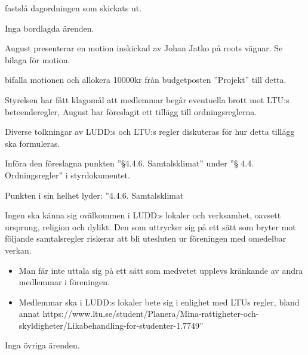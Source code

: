 \documentclass{protokoll}
\begin{document}
\newpage  


\begin{beslut}
     \att fastslå dagordningen som skickats ut.
\end{beslut}

Inga bordlagda ärenden.

August presenterar en motion inskickad av Johan Jatko på roots vägnar. Se
bilaga för motion. 
\begin{beslut}
    \att bifalla motionen och allokera 10000kr från budgetposten ''Projekt'' till detta.
\end{beslut}

Styrelsen har fått klagomål att medlemmar begår eventuella brott mot LTU:s 
beteenderegler, August har föreslagit ett tillägg till ordningsreglerna.  

Diverse tolkningar av LUDD:s och LTU:s regler diskuteras för hur detta tillägg
ska formuleras. 

\begin{beslut}
  \att Införa den föreslagna punkten ''\S 4.4.6. Samtalsklimat'' under ''\S
  4.4. Ordningsregler'' i styrdokumentet. 
\end{beslut}
Punkten i sin helhet lyder: 
''4.4.6. Samtalsklimat


Ingen ska känna sig ovälkommen i LUDD:s lokaler och verksamhet, oavsett ursprung, religion och dylikt. Den som uttrycker sig på ett sätt som bryter mot följande samtalsregler riskerar att bli utesluten ur föreningen med omedelbar verkan.

\begin{itemize}
  \item Man får inte uttala sig på ett sätt som medvetet upplevs kränkande av andra medlemmar i föreningen.
  \item Medlemmar ska i LUDD:s lokaler bete sig i enlighet med LTUs regler, bland annat https://www.ltu.se/student/Planera/Mina-rattigheter-och-skyldigheter/Likabehandling-for-studenter-1.7749''
\end{itemize}

Inga övriga ärenden.
\end{document}

